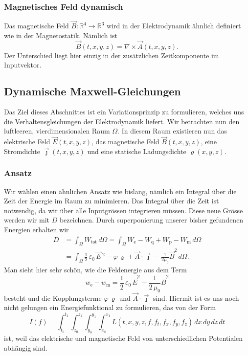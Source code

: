 \subsubsection{Magnetisches Feld dynamisch}
Das magnetische Feld
\(
\vec{B}: \mathbb{R}^4 \rightarrow \mathbb{R}^3
\)
wird in der Elektrodynamik ähnlich definiert wie in der Magnetostatik. Nämlich ist
\begin{equation}
	\vec{B}(t,x,y,z)
	=
	\nabla \times \vec{A}(t,x,y,z).
	\label{maxwell:section:definition_dynamisch_magnetischesFeld}
\end{equation}
Der Unterschied liegt hier einzig in der zusätzlichen Zeitkomponente im Inputvektor.

\subsection{Dynamische Maxwell-Gleichungen}
Das Ziel dieses Abschnittes ist ein Variationsprinzip zu formulieren, welches uns die Verhaltensgleichungen der Elektrodynamik liefert. 
Wir betrachten nun den luftleeren, vierdimensionalen Raum $\Omega$.
In diesem Raum existieren nun das elektrische Feld $\vec{E}(t,x,y,z)$, das magnetische Feld $\vec{B}(t,x,y,z)$, eine Stromdichte $\vec{\jmath}(t,x,y,z)$ und eine statische Ladungsdichte $\varrho(x,y,z)$.

\subsubsection{Ansatz}
Wir wählen einen ähnlichen Ansatz wie bislang, nämlich ein Integral über die Zeit der Energie im Raum zu minimieren.
Das Integral über die Zeit ist notwendig, da wir über alle Inputgrössen integrieren müssen.
Diese neue Grösse werden wir mit $D$ bezeichnen.
Durch superponierung unserer bisher gefundenen Energien erhalten wir
\begin{align*}
	D
	&=
	\int_{\Omega} W_{\text{tot}}\,d\Omega
	=
	\int_{\Omega} W_{\text{e}} - W_{\text{q}} + W_{\text{p}} - W_{\text{m}}\,d\Omega
				\\
	&= \int_{\Omega} \frac{1}{2}\,\varepsilon_0\,\vec{E}\,^2 - \varphi\,\varrho 
	+ \vec{A}\cdot\vec{\jmath} - \frac{1}{2\mu_0}\vec{B}^2 \,d\Omega.
\end{align*}
Man sieht hier sehr schön, wie die Feldenergie aus dem Term
\[
w_{\text{e}} - w_{\text{m}}
=
\frac{1}{2}\,\varepsilon_0\,\vec{E}^2 - \frac{1}{2\,\mu_0}\vec{B}^2
\]
besteht und die Kopplungsterme 
\(
\varphi\,\varrho
\)
und
\(
\vec{A}\cdot\vec{\jmath}
\)
sind.
Hiermit ist es uns noch nicht gelungen ein Energiefunktional zu formulieren, das von der Form
\[
I(f) = \int_{t_0}^{t_1} \int_{z_0}^{z_1} \int_{y_0}^{y_1} \int_{x_0}^{x_1} L(t,x,y,z,f,f_t,f_x,f_y,f_z)\,dx\,dy\,dz\,dt 
\]
ist, weil das elektrische und magnetische Feld von unterschiedlichen Potentialen abhängig sind.

